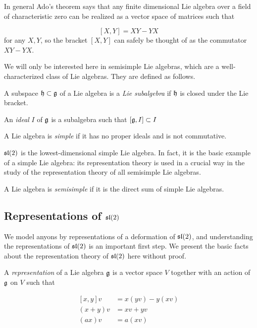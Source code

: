 In general Ado's theorem says that any finite dimensional Lie algebra over a
field of characteristic zero can be realized as a vector space of matrices such
that 

\[ \left[ X,Y \right] = XY - YX\] 
for any $X,Y$, so the bracket $[X,Y]$ can safely be thought of
as the commutator $XY - YX$. 


We will only be interested here in semisimple Lie algebras, which are a
well-characterized class of Lie algebras. They are defined as follows.

\begin{defn}
    A subspace $\mathfrak{h} \subset \mathfrak{g}$ of a Lie algebra is a
    \emph{Lie subalgebra} if $\mathfrak{h}$ is closed under the Lie bracket. 

    An \emph{ideal} $I$ of $\mathfrak{g}$ is a subalgebra such that
    $[\mathfrak{g}, I] \subset I$
\end{defn}

\begin{defn}
    A Lie algebra is \emph{simple} if it has no proper ideals and is not
    commutative. 
\end{defn}

$\mathfrak{sl}(2)$ is the lowest-dimensional simple Lie algebra. In fact, it is the
basic example of a simple Lie algebra: its representation theory is used in a
crucial way in the study of the representation theory of all semisimple Lie
algebras.

\begin{defn}
    A Lie algebra is \emph{semisimple} if it is the direct sum of simple Lie
    algebras.
\end{defn}

\subsection{Representations of $\mathfrak{sl}(2)$}
\label{subsection:RepsOfSL2}
We model anyons by representations of a deformation of $\mathfrak{sl}(2)$, and
understanding the representations of $\mathfrak{sl}(2)$ is an important first step. We
present the basic facts about the representation theory of $\mathfrak{sl}(2)$ here
without proof.

A \emph{representation} of a Lie algebra $\mathfrak{g}$ is a vector space $V$
together with an action of $\mathfrak{g}$ on $V$ such that 

\begin{align*}
    \left[ x,y \right] v &= x(yv) - y(xv) \\
    (x+y)v &= xv + yv \\
    (ax)v &= a(xv)
\end{align*}

